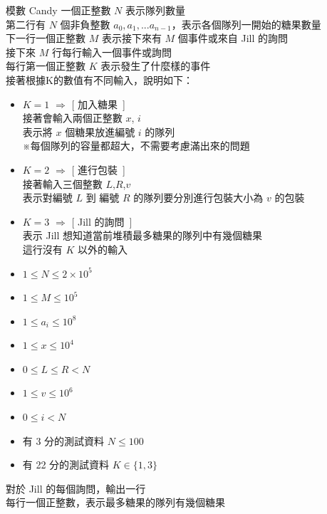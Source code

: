 \begin{problem}{模數 Candy}
一個正整數 $N$ 表示隊列數量 \\
第二行有 $N$ 個非負整數 $a_0,a_1,...a_{n-1}$，表示各個隊列一開始的糖果數量\\
下一行一個正整數 $M$ 表示接下來有 $M$ 個事件或來自 Jill 的詢問 \\
接下來 $M$ 行每行輸入一個事件或詢問 \\
每行第一個正整數 $K$ 表示發生了什麼樣的事件 \\
接著根據K的數值有不同輸入，說明如下：
\begin{itemize}
\item $K=1$ $\Rightarrow$ [ 加入糖果\ ] \\
接著會輸入兩個正整數 $x$, $i$ \\
表示將 $x$ 個糖果放進編號 $i$ 的隊列\\
※每個隊列的容量都超大，不需要考慮滿出來的問題
\item $K=2$ $\Rightarrow$ [ 進行包裝\ ] \\
接著輸入三個整數 $L$,$R$,$v$ \\
 表示對編號 $L$ 到 編號 $R$ 的隊列要分別進行包裝大小為 $v$ 的包裝
\item $K=3$ $\Rightarrow$ [ Jill 的詢問\ ] \\
表示 Jill 想知道當前堆積最多糖果的隊列中有幾個糖果\\
這行沒有 $K$ 以外的輸入
\end{itemize}

\begin{iofmt}
\begin{itemize}
	\item $1 \leq N \leq 2\times 10^5$ %
    \item $1 \leq M \leq 10^5$
    \item $1 \leq a_i \leq 10^8$
    \item $1 \leq x \leq 10^4$
	\item $0 \leq L \leq R < N$
	\item $1 \leq v \leq 10^6$
    \item $0 \leq i < N$
	\item 有 3 分的測試資料 $N \leq 100$
	\item 有 22 分的測試資料 $K \in \{1,3\}$
\end{itemize}
\end{iofmt}

\OutputFile

對於 Jill 的每個詢問，輸出一行\\
每行一個正整數，表示最多糖果的隊列有幾個糖果

\Examples

\begin{example}
\end{example}

\end{problem}
